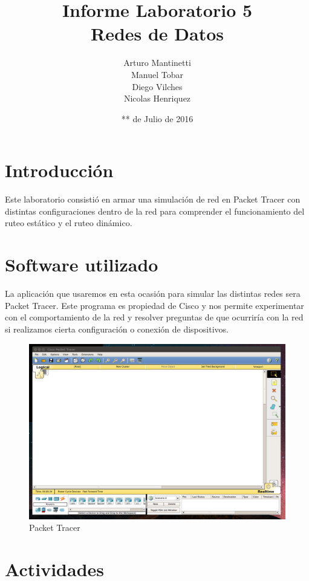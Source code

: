 \documentclass[spanish]{udpreport}
\title{Informe Laboratorio 5 \\ Redes de Datos}
\author{Arturo Mantinetti \\ Manuel Tobar \\ Diego Vilches \\ Nicolas Henriquez}
\date{** de Julio de 2016}
\begin{document}
\maketitle

\tableofcontents

\chapter{Introducción}

Este laboratorio consistió en armar una simulación de red en Packet Tracer con distintas configuraciones dentro de la red para comprender el funcionamiento del ruteo estático y el ruteo dinámico.

\chapter{Software utilizado}
La aplicación que usaremos en esta ocasión para simular las distintas redes sera Packet Tracer. Este programa es propiedad de Cisco y nos permite experimentar con el comportamiento de la red y resolver preguntas de que ocurriría con la red si realizamos cierta configuración o conexión de dispositivos.

\begin{figure}[H]
	\centering
	\includegraphics[scale=.25]{imagenes/A0e.png}
	\caption{Packet Tracer}
	\label{fig:Figura 1.1}
\end{figure}


\chapter{Actividades}
\end{document}
